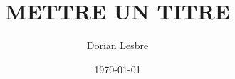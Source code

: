 \documentclass[12pt,a4paper]{article}
\title{METTRE UN TITRE}
\author{Dorian Lesbre}
\date{\today}
\begin{document}
\maketitle



\nocite{*} %


\end{document}
